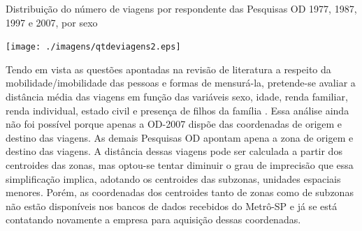 \begin{table}[htb]
\end{table}


\begin{grafico}[htb]%
    \caption{\label{graf:distr-num-viag}Distribuição do número de viagens por respondente das Pesquisas OD 1977, 1987, 1997 e 2007, por sexo}%
    \begin{center}%
        \texttt{[image: ./imagens/qtdeviagens2.eps]}%
    \end{center}%
\end{grafico}%

\clearpage

Tendo em vista as questões apontadas na revisão de literatura a respeito da mobilidade/imobilidade das pessoas e formas de mensurá-la, pretende-se avaliar a distância média das viagens em função das variáveis sexo, idade, renda familiar, renda individual, estado civil e presença de filhos da família \cite{ROSENBLOOM2006,SHEARMUR2006,HANSON2010}. Essa análise ainda não foi possível porque apenas a OD-2007 dispõe das coordenadas de origem e destino das viagens. As demais Pesquisas OD apontam apena a zona de origem e destino das viagens. A distância dessas viagens pode ser calculada a partir dos centroides das zonas, mas optou-se tentar diminuir o grau de imprecisão que essa simplificação implica, adotando os centroides das subzonas, unidades espaciais menores. Porém, as coordenadas dos centroides tanto de zonas como de subzonas não estão disponíveis nos bancos de dados recebidos do Metrô-SP e já se está contatando novamente a empresa para aquisição dessas coordenadas.

